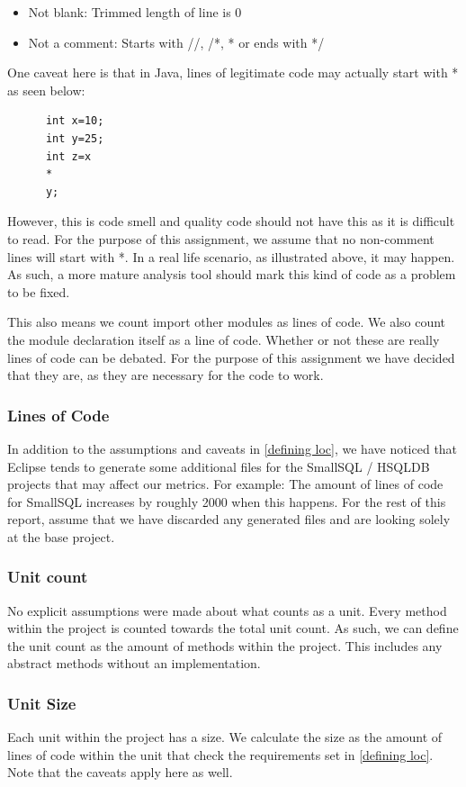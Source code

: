 \documentclass{article}
\begin{document}
\begin{itemize}
\item Not blank: Trimmed length of line is 0
\item Not a comment: Starts with //, /*, * or ends with */
\end{itemize}

One caveat here is that in Java, lines of legitimate code may actually start with * as seen below:
\begin{lstlisting}
      int x=10;
      int y=25;
      int z=x
      *
      y;
\end{lstlisting}

However, this is code smell and quality code should not have this as it is difficult to read. For the purpose of this assignment, we assume that no non-comment lines will start with *.
In a real life scenario, as illustrated above, it may happen. As such, a more mature analysis tool should mark this kind of code as a problem to be fixed.

This also means we count import other modules as lines of code. We also count the module declaration itself as a line of code. Whether or not these are really lines of code can be debated. For the purpose of this assignment we have decided that they are, as they are necessary for the code to work.

\subsubsection{Lines of Code}
In addition to the assumptions and caveats in \ref{defining loc}, we have noticed that Eclipse tends to generate some additional files for the SmallSQL / HSQLDB projects that may affect our metrics. For example: The amount of lines of code for SmallSQL increases by roughly 2000 when this happens.
For the rest of this report, assume that we have discarded any generated files and are looking solely at the base project.

\subsubsection{Unit count}
No explicit assumptions were made about what counts as a unit. Every method within the project is counted towards the total unit count.
As such, we can define the unit count as the amount of methods within the project. This includes any abstract methods without an implementation.

\subsubsection{Unit Size}
Each unit within the project has a size. We calculate the size as the amount of lines of code within the unit that check the requirements set in \ref{defining loc}. Note that the caveats apply here as well.
\end{document}
